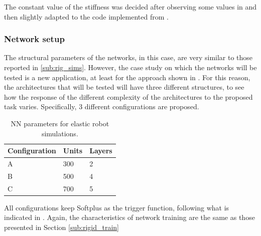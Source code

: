 \documentclass[a4paper]{article}
\begin{document}
The constant value of the stiffness was decided after observing some values in \cite{giusti} and then slightly adapted to the code implemented from \cite{lnncranmer}.

\subsubsection{Network setup}
\label{subsubsec:nn_elastic}
The structural parameters of the networks, in this case, are very similar to those reported in \ref{sub:rig_sims}. However, the case study on which the networks will be tested is a new application, at least for the approach shown in \cite{lnncranmer}. For this reason, the architectures that will be tested will have three different structures, to see how the response of the different complexity of the architectures to the proposed task varies. Specifically, 3 different configurations are proposed.

\begin{table}
    \centering
    \caption{NN parameters for elastic robot simulations.}
    \begin{tabular}{P{2.5cm}P{2.5cm}P{2.5cm}} 
    \hline\hline
    \textbf{Configuration} & \textbf{Units} & \textbf{Layers} \\ 
    \hline
     A & 300 & 2\\
    \hline
     B & 500 & 4\\
     \hline
     C & 700 & 5\\
    \hline\hline
    \end{tabular}
    \label{tab:elastic_networks}    
\end{table}

All configurations keep Softplus as the trigger function, following what is indicated in \cite{lnncranmer}. Again, the characteristics of network training are the same as those presented in Section \ref{sub:rigid_train}
\end{document}

